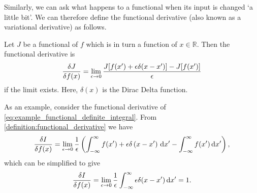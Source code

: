 Similarly, we can ask what happens to a functional when its input is changed `a little bit'. We can therefore
define the functional derivative (also known as a variational derivative) as follows.
\begin{definition}
  \label{definition:functional_derivative}
  Let $J$ be a functional of $f$ which is in turn a function of $x \in \mathbb{R}$. Then the functional derivative is
  \begin{equation}
    \label{eq:definition_of_functional_derivative}
    \fdv{J}{f(x)} = \lim_{\epsilon\rightarrow 0} \frac{J[f(x') + \epsilon \delta(x - x')] - J[f(x')]}{\epsilon}
  \end{equation}
  if the limit exists. Here, $\delta(x)$ is the Dirac Delta function.
\end{definition}

As an example, consider the functional derivative of \cref{eq:example_functional_definite_integral}. From \cref{definition:functional_derivative}
we have
\begin{equation*}
  \fdv{I}{f(x)} = \lim_{\epsilon\rightarrow 0} \frac{1}{\epsilon} \left(\int_{-\infty}^{\infty} f(x') + \epsilon \delta\left(x-x'\right)\,\mathrm{d}x' 
      - \int_{-\infty}^{\infty} f(x')\,\mathrm{d}x'\right),
\end{equation*}
which can be simplified to give
\begin{equation*}
  \fdv{I}{f(x)} = \lim_{\epsilon\rightarrow 0}\frac{1}{\epsilon}\int_{-\infty}^{\infty} \epsilon \delta(x-x')\,\mathrm{d}x' = 1.
\end{equation*}

